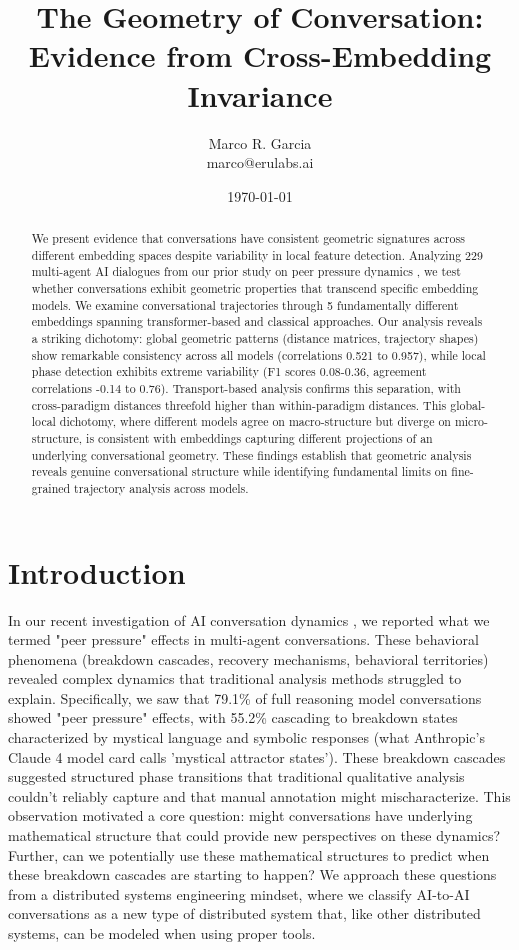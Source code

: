 \documentclass[11pt,letterpaper]{article}
\title{The Geometry of Conversation: Evidence from Cross-Embedding Invariance}
\author{
Marco R. Garcia \\
marco@erulabs.ai
}
\date{\today}
\newcommand{\totalConversations}{229}
\newcommand{\numEmbeddingModels}{5}
\newcommand{\minPairwiseCorr}{0.521}
\newcommand{\maxPairwiseCorr}{0.957}
\begin{document}
\maketitle

\begin{abstract}
We present evidence that conversations have consistent geometric signatures across different embedding spaces despite variability in local feature detection. Analyzing \totalConversations{} multi-agent AI dialogues from our prior study on peer pressure dynamics \citep{garcia2025peer}, we test whether conversations exhibit geometric properties that transcend specific embedding models. We examine conversational trajectories through \numEmbeddingModels{} fundamentally different embeddings spanning transformer-based and classical approaches. Our analysis reveals a striking dichotomy: global geometric patterns (distance matrices, trajectory shapes) show remarkable consistency across all models (correlations \minPairwiseCorr{} to \maxPairwiseCorr{}), while local phase detection exhibits extreme variability (F1 scores 0.08-0.36, agreement correlations -0.14 to 0.76). Transport-based analysis confirms this separation, with cross-paradigm distances threefold higher than within-paradigm distances. This global-local dichotomy, where different models agree on macro-structure but diverge on micro-structure, is consistent with embeddings capturing different projections of an underlying conversational geometry. These findings establish that geometric analysis reveals genuine conversational structure while identifying fundamental limits on fine-grained trajectory analysis across models.
\end{abstract}

\section{Introduction}

In our recent investigation of AI conversation dynamics \citep{garcia2025peer}, we reported what we termed "peer pressure" effects in multi-agent conversations. These behavioral phenomena (breakdown cascades, recovery mechanisms, behavioral territories) revealed complex dynamics that traditional analysis methods struggled to explain. Specifically, we saw that 79.1\% of full reasoning model conversations showed "peer pressure" effects, with 55.2\% cascading to breakdown states characterized by mystical language and symbolic responses (what Anthropic's Claude 4 model card calls 'mystical attractor states'). These breakdown cascades suggested structured phase transitions that traditional qualitative analysis couldn't reliably capture and that manual annotation might mischaracterize. This observation motivated a core question: might conversations have underlying mathematical structure that could provide new perspectives on these dynamics? Further, can we potentially use these mathematical structures to predict when these breakdown cascades are starting to happen? We approach these questions from a distributed systems engineering mindset, where we classify AI-to-AI conversations as a new type of distributed system that, like other distributed systems, can be modeled when using proper tools. 
\end{document}
